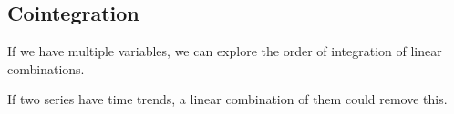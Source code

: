 
\subsection{Cointegration}

If we have multiple variables, we can explore the order of integration of linear combinations.

If two series have time trends, a linear combination of them could remove this.

